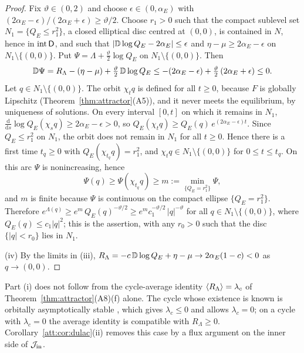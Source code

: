 \begin{proof}
Fix $\vartheta\in(0,2)$ and choose $\epsilon\in(0,\alpha_E)$ with $(2\alpha_E-\epsilon)/(2\alpha_E+\epsilon)\ge\vartheta/2$. Choose $r_1>0$ such that the compact sublevel set $N_1=\{Q_E\le r_1^2\}$, a closed elliptical disc centred at $(0,0)$, is contained in $N$, hence in $\operatorname{int}\mathsf D$, and such that $|\mathbb D\log Q_E-2\alpha_E|\le\epsilon$ and $\eta-\mu\ge2\alpha_E-\epsilon$ on $N_1\setminus\{(0,0)\}$. Put $\Psi=\Lambda+\tfrac\vartheta2\log Q_E$ on $N_1\setminus\{(0,0)\}$. Then
\[
\mathbb D\Psi=R_\Lambda-(\eta-\mu)+\tfrac\vartheta2\,\mathbb D\log Q_E\le-(2\alpha_E-\epsilon)+\tfrac\vartheta2\,(2\alpha_E+\epsilon)\le0 .
\]
Let $q\in N_1\setminus\{(0,0)\}$. The orbit $\chi_tq$ is defined for all $t\ge0$, because $F$ is globally Lipschitz (Theorem~\ref{thm:attractor}(A5)), and it never meets the equilibrium, by uniqueness of solutions. On every interval $[0,t]$ on which it remains in $N_1$, $\frac{\mathrm d}{\mathrm ds}\log Q_E(\chi_sq)\ge2\alpha_E-\epsilon>0$, so $Q_E(\chi_tq)\ge Q_E(q)\,e^{(2\alpha_E-\epsilon)t}$. Since $Q_E\le r_1^2$ on $N_1$, the orbit does not remain in $N_1$ for all $t\ge0$. Hence there is a first time $t_q\ge0$ with $Q_E(\chi_{t_q}q)=r_1^2$, and $\chi_tq\in N_1\setminus\{(0,0)\}$ for $0\le t\le t_q$. On this arc $\Psi$ is nonincreasing, hence
\[
\Psi(q)\ge\Psi(\chi_{t_q}q)\ge m:=\min_{\{Q_E=r_1^2\}}\Psi ,
\]
and $m$ is finite because $\Psi$ is continuous on the compact ellipse $\{Q_E=r_1^2\}$. Therefore $e^{\Lambda(q)}\ge e^{m}\,Q_E(q)^{-\vartheta/2}\ge e^{m}c_1^{-\vartheta/2}\,|q|^{-\vartheta}$ for all $q\in N_1\setminus\{(0,0)\}$, where $Q_E(q)\le c_1|q|^2$; this is the assertion, with any $r_0>0$ such that the disc $\{|q|<r_0\}$ lies in $N_1$.

(iv) By the limits in (iii), $R_\Lambda=-c\,\mathbb D\log Q_E+\eta-\mu\to2\alpha_E(1-c)<0$ as $q\to(0,0)$.
\end{proof}

Part (i) does not follow from the cycle-average identity $\left\langle R_\Lambda\right\rangle=\lambda_c$ of Theorem~\ref{thm:attractor}(A8)(f) alone. The cycle whose existence is known is orbitally asymptotically stable \cite{Smith12}, which gives $\lambda_c\le0$ and allows $\lambda_c=0$; on a cycle with $\lambda_c=0$ the average identity is compatible with $R_\Lambda\ge0$. Corollary~\ref{att:cor:dulac}(ii) removes this case by a flux argument on the inner side of $\mathcal J_{\rm in}$.

